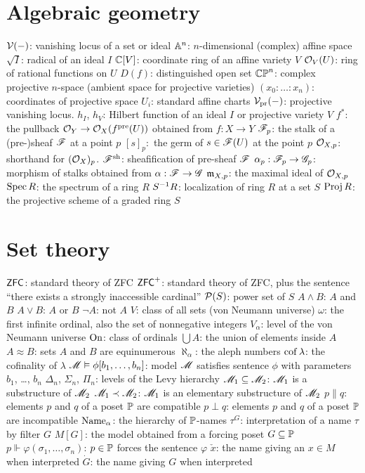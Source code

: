 \section{Algebraic geometry}
\begin{itemize}
	\ii $\mathcal V(-)$: vanishing locus of a set or ideal
	\ii $\mathbb A^n$: $n$-dimensional (complex) affine space
	\ii $\sqrt I$: radical of an ideal $I$
	\ii $\mathbb C[V]$: coordinate ring of an affine variety $V$
	\ii $\mathcal O_V(U)$: ring of rational functions on $U$
	\ii $D(f)$: distinguished open set
	\ii $\mathbb{CP}^n$: complex projective $n$-space (ambient space for projective varieties)
	\ii $(x_0 : \dots : x_n)$: coordinates of projective space
	\ii $U_i$: standard affine charts
	\ii $\mathcal V_{\text{pr}}(-)$: projective vanishing locus.
	\ii $h_I$, $h_V$: Hilbert function of an ideal $I$ or projective variety $V$
	\ii $f^\ast$: the pullback $\mathcal O_Y \to \mathcal O_X(f^{\text{pre}}(U))$ obtained from $f : X \to Y$
	\ii $\mathscr F_p$: the stalk of a (pre-)sheaf $\mathscr F$ at a point $p$
	\ii $[s]_p:$ the germ of $s \in \mathscr F(U)$ at the point $p$
	\ii $\mathcal O_{X,p}$: shorthand for $(\mathcal O_X)_p$.
	\ii $\mathscr F^\mathrm{sh}$: sheafification of pre-sheaf $\mathscr F$
	\ii $\alpha_p : \mathscr F_p \to \mathscr G_p$: morphism of stalks obtained from $\alpha : \mathscr F \to \mathscr G$
	\ii $\mathfrak m_{X,p}$: the maximal ideal of $\mathcal O_{X,p}$
	\ii $\operatorname{Spec} R$: the spectrum of a ring $R$
	\ii $S^{-1} R$: localization of ring $R$ at a set $S$
	\ii $\operatorname{Proj} R$: the projective scheme of a graded ring $S$
\end{itemize}

\section{Set theory}
\begin{itemize}
	\ii $\mathsf{ZFC}$: standard theory of ZFC
	\ii $\mathsf{ZFC}^+$: standard theory of ZFC, plus the sentence
	``there exists a strongly inaccessible cardinal''
	\ii $\mathcal P(S)$: power set of $S$
	\ii $A \land B$: $A$ and $B$
	\ii $A \lor B$: $A$ or $B$
	\ii $\neg A$: not $A$
	\ii $V$: class of all sets (von Neumann universe)
	\ii $\omega$: the first infinite ordinal, also the set of nonnegative integers
	\ii $V_\alpha$: level of the von Neumann universe
	\ii $\mathrm{On}$: class of ordinals
	\ii $\bigcup A$: the union of elements inside $A$
	\ii $A \approx B$: sets $A$ and $B$ are equinumerous
	\ii $\aleph_\alpha$: the aleph numbers
	\ii $\operatorname{cof} \lambda$: the cofinality of $\lambda$
	\ii $\mathscr M \vDash \phi[b_1, \dots, b_n]$: model $\mathscr M$ satisfies sentence $\phi$
	with parameters $b_1$, \dots, $b_n$
	\ii $\Delta_n$, $\Sigma_n$, $\Pi_n$: levels of the Levy hierarchy
	\ii $\mathscr M_1 \subseteq \mathscr M_2$: $\mathscr M_1$ is a substructure of $\mathscr M_2$
	\ii $\mathscr M_1 \prec \mathscr M_2$: $\mathscr M_1$ is an elementary substructure of $\mathscr M_2$
	\ii $p \parallel q$: elements $p$ and $q$ of a poset $\mathbb P$ are compatible
	\ii $p \perp q$: elements $p$ and $q$ of a poset $\mathbb P$ are incompatible
	\ii $\text{Name}_\alpha$: the hierarchy of $\mathbb P$-names
	\ii $\tau^G$: interpretation of a name $\tau$ by filter $G$
	\ii $M[G]$: the model obtained from a forcing poset $G \subseteq \mathbb P$
	\ii $p \Vdash \varphi(\sigma_1, \dots, \sigma_n)$: $p \in \mathbb P$ forces the sentence $\varphi$
	\ii $\check x$: the name giving an $x \in M$ when interpreted
	\ii $\dot G$: the name giving $G$ when interpreted
\end{itemize}


